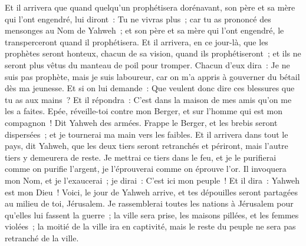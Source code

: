 \begin{multicols}{2}
Et il arrivera que quand quelqu'un prophétisera dorénavant, son père et sa mère qui l'ont engendré, lui diront~: Tu ne vivras plus~; car tu as prononcé des mensonges au Nom de Yahweh~; et son père et sa mère qui l'ont engendré, le transperceront quand il prophétisera.
Et il arrivera, en ce jour-là, que les prophètes seront honteux, chacun de sa vision, quand ils prophétiseront~; et ils ne seront plus vêtus du manteau de poil pour tromper.
Chacun d'eux dira~: Je ne suis pas prophète, mais je suis laboureur, car on m'a appris à gouverner du bétail dès ma jeunesse.
Et si on lui demande~: Que veulent donc dire ces blessures que tu as aux mains~? Et il répondra~: C'est dans la maison de mes amis qu'on me les a faites.
Epée, réveille-toi contre mon Berger, et sur l'homme qui est mon compagnon~! Dit Yahweh des armées. Frappe le Berger, et les brebis seront dispersées~; et je tournerai ma main vers les faibles.
Et il arrivera dans tout le pays, dit Yahweh, que les deux tiers seront retranchés et périront, mais l'autre tiers y demeurera de reste.
Je mettrai ce tiers dans le feu, et je le purifierai comme on purifie l'argent, je l'éprouverai comme on éprouve l'or. Il invoquera mon Nom, et je l'exaucerai~; je dirai~: C'est ici mon peuple~! Et il dira~: Yahweh est mon Dieu~!
\VerseOne{}Voici, le jour de Yahweh arrive, et tes dépouilles seront partagées au milieu de toi, Jérusalem.
Je rassemblerai toutes les nations à Jérusalem pour qu'elles lui fassent la guerre~; la ville sera prise, les maisons pillées, et les femmes violées~; la moitié de la ville ira en captivité, mais le reste du peuple ne sera pas retranché de la ville.

\end{multicols}
